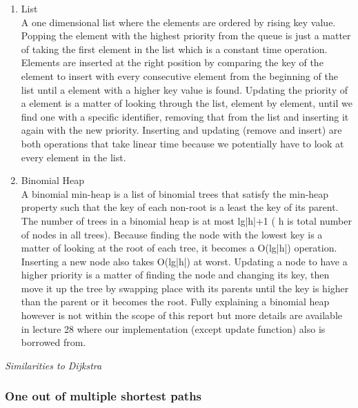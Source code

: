 \documentclass[12pt, a4paper]{article}
\begin{document}
\begin{enumerate}
\item{List}\\
A one dimensional list where the elements are ordered by rising key value. Popping the element with the highest priority from the queue is just a matter of taking the first element in the list which is a constant time operation. Elements are inserted at the right position by comparing the key of the element to insert with every consecutive element from the beginning of the list until a element with a higher key value is found. Updating the priority of a element is a matter of looking through the list, element by element, until we find one with a specific identifier, removing that from the list and inserting it again with the new priority. Inserting and updating (remove and insert) are both operations that take linear time because we potentially have to look at every element in the list.

\item{Binomial Heap}\\
A binomial min-heap is a list of binomial trees that satisfy the min-heap property such that the key of each non-root is a least the key of its parent. The number of trees in a binomial heap is at most lg|h|+1 ( h is total number of nodes in all trees). Because finding the node with the lowest key is a matter of looking at the root of each tree, it becomes a O(lg|h|) operation. Inserting a new node also takes O(lg|h|) at worst. Updating a node to have a higher priority is a matter of finding the node and changing its key, then move it up the tree by swapping place with its parents until the key is higher than the parent or it becomes the root. Fully explaining a binomial heap however is not within the scope of this report but more details are available in lecture 28 \cite{lecture28} where our implementation (except update function) also is borrowed from.

\end{enumerate}

\textit{Similarities to Dijkstra}




\subsubsection{One out of multiple shortest paths}
\end{document}
